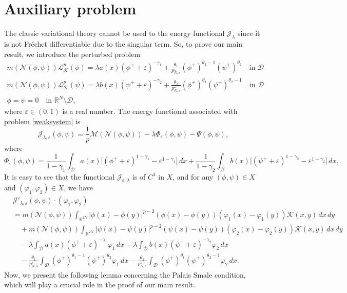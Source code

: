 \documentclass[10pt,a4paper]{amsart}
\numberwithin{equation}{section}
\begin{document}
\section{Auxiliary problem}
The classic variational theory cannot be used to the energy functional 
$\mathcal{J}_\lambda$ since it is not Fr\'echet differentiable due to the singular term. 
So, to prove our main result, we introduce the perturbed problem
\begin{equation}\label{weaksystem}
\begin{gathered}
m(\mathcal{N}(\phi,\psi))\mathcal{L}_\mathcal{K}^p(\phi)=\lambda a(x)(\phi^+
 +\varepsilon)^{-\gamma_1}+\frac{\theta_1}{p^\star_{N,s}}(\phi^+)^{\theta_1-1}
 (\psi^+)^{\theta_2} \quad \text{in } \mathcal{D} \\
m(\mathcal{N}(\phi,\psi))\mathcal{L}_\mathcal{K}^p(\psi)=\lambda b(x)(\psi^+
 +\varepsilon)^{-\gamma_2}+\frac{\theta_2}{p^\star_{N,s}}(\phi^+)^{\theta_1}
 (\psi^+)^{\theta_2-1} \quad \text{in } \mathcal{D} \\
\phi=\psi=0 \quad \text{in } \mathbb{R}^N\setminus \mathcal{D},
\end{gathered}
\end{equation}
where $\varepsilon\in (0,1)$ is a real number. The energy functional associated with 
problem \eqref{weaksystem} is 
$$
\mathcal{J}_{\lambda,\varepsilon}(\phi,\psi)
=\frac{1}{p}\mathscr{M}(\mathcal{N}(\phi,\psi))
-\lambda \Phi_\varepsilon(\phi,\psi)-\Psi(\phi,\psi),
$$
where
$$
\Phi_\varepsilon(\phi,\psi)=\frac{1}{1-\gamma_1}\int_\mathcal{D} a(x)\Big[(\phi^+
+\varepsilon)^{1-\gamma_1}-\varepsilon^{1-\gamma_1}\Big]\,dx
+\frac{1}{1-\gamma_2}\int_\mathcal{D}b(x)\Big[(\psi^+
+\varepsilon)^{1-\gamma_2}-\varepsilon^{1-\gamma_2}\Big]\,dx,
$$
It is easy to see that the functional $\mathcal{J}_{\varepsilon,\lambda}$ is of 
$C^1$ in $X$, and for any $(\phi,\psi)\in X$ and $(\varphi_1,\varphi_2)\in X$, we have
\begin{equation} \label{p11}
\begin{aligned}
&\mathcal{J}'_{\lambda,\varepsilon}(\phi,\psi)\cdot (\varphi_1,\varphi_2) \\
&=m(\mathcal{N}(\phi,\psi))\int_{\mathbb{R}^{2N}}|\phi(x)-\phi(y)|^{p-2}(\phi(x)-\phi(y))
 (\varphi_1(x)-\varphi_1(y))\mathcal{K}(x,y)\,dx\,dy \\
&\quad +m(\mathcal{N}(\phi,\psi))\int_{\mathbb{R}^{2N}}|\psi(x)-\psi(y)|^{p-2}(\psi(x)-\psi(y))
 (\varphi_2(x)-\varphi_2(y))\mathcal{K}(x,y)\,dx\,dy \\
&\quad -\lambda \int_\mathcal{D} a(x)(\phi^++\varepsilon)^{-\gamma_1}\varphi_1\,dx
 -\lambda\int_\mathcal{D}b(x)(\psi^++\varepsilon)^{-\gamma_2}\varphi_2\,dx  \\
&\quad -\frac{\theta_1}{p^\star_{N,s}}\int_\mathcal{D}(\phi^+)^{\theta_1-1}
(\psi^+)^{\theta_2}\varphi_1\,dx-\frac{\theta_2}{p^\star_{N,s}}
\int_\mathcal{D}(\phi^+)^{\theta_1}(\psi^+)^{\theta_2-1}\varphi_2\,dx.
\end{aligned}
\end{equation}
Now, we present the following lemma concerning the Palais Smale condition, which will
play a crucial role in the proof of our main result.
\end{document}
